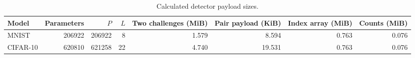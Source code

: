 \begin{table}[t]\centering\footnotesize
\caption{Calculated detector payload sizes.}\label{tab:payload}
\begin{tabular}{lrrrrrrr}\toprule
Model & Parameters & $P$ & $L$ & Two challenges (MiB) & Pair payload (KiB) & Index array (MiB) & Counts (MiB) \\ \midrule
MNIST & 206922 & 206922 & 8 & 1.579 & 8.594 & 0.763 & 0.076 \\
CIFAR-10 & 620810 & 621258 & 22 & 4.740 & 19.531 & 0.763 & 0.076 \\
\bottomrule\end{tabular}\end{table}
